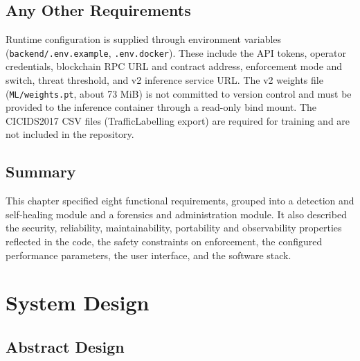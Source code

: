 \documentclass[12pt,a4paper]{report}
\begin{document}
\section{Any Other Requirements }
\par Runtime configuration is supplied through environment variables (\texttt{backend/\allowbreak{}.env.example}, \texttt{.env.docker}). These include the API tokens, operator credentials, blockchain RPC URL and contract address, enforcement mode and switch, threat threshold, and v2 inference service URL. The v2 weights file (\texttt{ML/\allowbreak{}weights.pt}, about 73 MiB) is not committed to version control and must be provided to the inference container through a read-only bind mount. The CICIDS2017 CSV files (TrafficLabelling export) are required for training and are not included in the repository.

\section{Summary}
\par This chapter specified eight functional requirements, grouped into a detection and self-healing module and a forensics and administration module. It also described the security, reliability, maintainability, portability and observability properties reflected in the code, the safety constraints on enforcement, the configured performance parameters, the user interface, and the software stack.


 \newpage
 \chapter{System Design}


 \section{Abstract Design}
\end{document}
